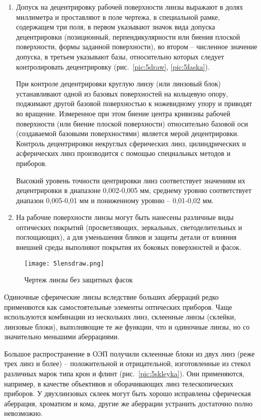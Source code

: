 \begin{enumerate}
\item Допуск на децентрировку рабочей поверхности линзы выражают в долях миллиметра и проставляют в поле чертежа, в специальной рамке, содержащем три поля, в первом указывают значок вида допуска децентрировки (позиционный, перпендикулярности или биения плоской поверхности, формы заданной поверхности), во втором -- численное значение допуска, в третьем указывают базы, относительно которых следует контролировать децентрировку (рис.~\ref{pic:5draw}, \ref{pic:5faska}).

При контроле децентрировки круглую линзу (или линзовый блок) устанавливают одной из базовых поверхностей на кольцевую опору, поджимают другой базовой поверхностью к ножевидному упору и приводят во вращение. Измеренное при этом биение центра кривизны рабочей поверхности (или биение плоской поверхности) относительно базовой оси (создаваемой базовыми поверхностями) является мерой децентрировки. Контроль децентрировки некруглых сферических линз, цилиндрических и асферических линз производится с помощью специальных методов и приборов.

Высокий уровень точности центрировки линз соответствует значениям их децентрировки в диапазоне 0,002-0,005 мм, среднему уровню соответствует диапазон 0,005-0,01 мм и пониженному уровню -- 0,01-0,02 мм.

\item На рабочие  поверхности  линзы  могут  быть нанесены различные виды оптических покрытий (просветляющих, зеркальных, светоделительных и поглощающих), а для уменьшения бликов и защиты детали от влияния внешней среды выполняют покрытия их боковых поверхностей и фасок.
\end{enumerate}

\begin{figure}[h!]
	\caption{Чертеж линзы без защитных фасок}
	\texttt{[image: 5lensdraw.png]}
	\label{pic:5lensdraw}
\end{figure}

Одиночные сферические линзы вследствие больших аберраций редко применяются как самостоятельные элементы оптических приборов. Чаще используются комбинации из нескольких линз, склеенные линзы (склейки, линзовые блоки), выполняющие те же функции, что и одиночные линзы, но со значительно меньшими аберрациями.

Большое распространение в ОЭП получили склеенные блоки из двух линз (реже трех линз и более) -- положительной и отрицательной, изготовленные из стекол различных марок типа крон и флинт (рис.~\ref{pic:5skleyka}). Они применяются, например, в качестве объективов и оборачивающих линз телескопических приборов. У двухлинзовых склеек могут быть хорошо исправлены сферическая аберрация, хроматизм и кома, другие же аберрации устранить достаточно полно невозможно.

